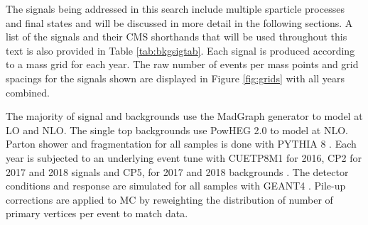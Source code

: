 The signals being addressed in this search include multiple sparticle processes and final states and will be discussed in more detail in the following sections. A list of the signals and their CMS shorthands that will be used throughout this text is also provided in Table \ref{tab:bkgsigtab}. Each signal is produced according to a mass grid for each year.  The raw number of events per mass points and grid spacings for the signals shown are displayed in Figure \ref{fig:grids} with all years combined. 


The majority of signal and backgrounds use the MadGraph \cite{Alwall:2011uj} generator to model at LO and NLO. The single top backgrounds use PowHEG 2.0 \cite{Alioli:2010xd} to model at NLO. Parton shower and fragmentation for all samples is done with PYTHIA 8 \cite{Sjostrand:2014zea}. Each year is subjected to an underlying event tune with CUETP8M1 for 2016, CP2 for 2017 and 2018 signals and CP5, for 2017 and 2018 backgrounds \cite{CMS:2015wcf}\cite{CMS:2019csb}. The detector conditions and response are simulated for all samples with GEANT4 \cite{GEANT4:2002zbu}. Pile-up corrections are applied to MC by reweighting the distribution of number of primary vertices per event to match data.

